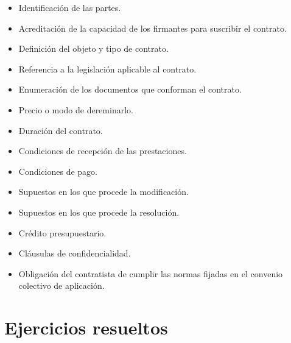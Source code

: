 \documentclass[12pt,spanish]{article}
\begin{document}
\begin{itemize}
	\item Identificación de las partes.
	\item Acreditación de la capacidad de los firmantes para suscribir el contrato.
	\item Definición del objeto y tipo de contrato.
	\item Referencia a la legislación aplicable al contrato.
	\item Enumeración de los documentos que conforman el contrato.
	\item Precio o modo de dereminarlo.
	\item Duración del contrato.
	\item Condiciones de recepción de las prestaciones.
	\item Condiciones de pago.
	\item Supuestos en los que procede la modificación.
	\item Supuestos en los que procede la resolución.
	\item Crédito presupuestario.
	\item Cláusulas de confidencialidad.
	\item Obligación del contratista de cumplir las normas fijadas en el convenio colectivo de aplicación.
\end{itemize}




\section{Ejercicios resueltos}

\end{document}
